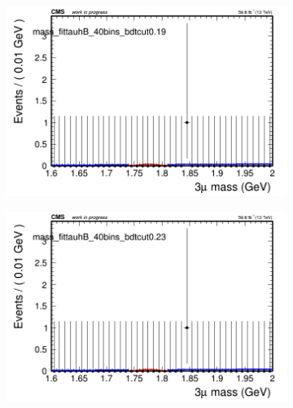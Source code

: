 \begin{figure}[H]
\begin{subfigure}{0.2\textwidth}
        \caption{}
    \end{subfigure}
    \begin{subfigure}{0.2\textwidth}
        \includegraphics[width=\textwidth]{unfixed_exp/plots/tauhB/massfit_tauhB_40bins_bdtcut0.19.png}
        \caption{}
    \end{subfigure}
    \begin{subfigure}{0.2\textwidth}
        \includegraphics[width=\textwidth]{unfixed_exp/plots/tauhB/massfit_tauhB_40bins_bdtcut0.23.png}
        \caption{}
    \end{subfigure}
    \begin{subfigure}{0.2\textwidth}

\end{subfigure}
\end{figure}
